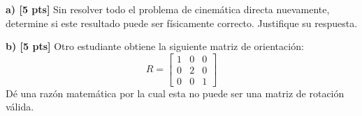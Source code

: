 \documentclass[11pt, a4paper]{article}
\begin{document}
\textbf{a) [5 pts]} Sin resolver todo el problema de cinemática directa nuevamente, determine si este resultado puede ser físicamente correcto. Justifique su respuesta.

\textbf{b) [5 pts]} Otro estudiante obtiene la siguiente matriz de orientación:
\begin{equation*}
    R = \begin{bmatrix} 1 & 0 & 0 \\ 0 & 2 & 0 \\ 0 & 0 & 1 \end{bmatrix}
\end{equation*}
Dé una razón matemática por la cual esta no puede ser una matriz de rotación válida.
\end{document}
